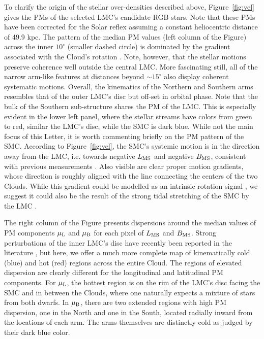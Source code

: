\documentclass[a4paper,useAMS,usenatbib]{mnras}
\begin{document}
To clarify the origin of the stellar over-densities described above,
Figure~\ref{fig:vel} gives the PMs of the selected LMC's candidate RGB
stars. Note that these PMs have been corrected for the Solar reflex
assuming a constant heliocentric distance of 49.9 kpc. The pattern of
the median PM values (left column of the Figure) across the inner
$10^{\circ}$ (smaller dashed circle) is dominated by the gradient
associated with the Cloud's rotation \citep[see
  also][]{Vasiliev2018}. Note, however, that the stellar motions
preserve coherence well outside the central LMC. More fascinating
still, all of the narrow arm-like features at distances beyond
$\sim15^{\circ}$ also display coherent systematic motions. Overall,
the kinematics of the Northern and Southern arms resembles that of the
outer LMC's disc but off-set in orbital phase. Note that the bulk of
the Southern sub-structure shares the PM of the LMC. This is
especially evident in the lower left panel, where the stellar streams
have colors from green to red, similar the LMC's disc, while the SMC
is dark blue. While not the main focus of this Letter, it is worth
commenting briefly on the PM pattern of the SMC. According to
Figure~\ref{fig:vel}, the SMC's systemic motion is in the direction
away from the LMC, i.e. towards negative $L_{\rm MS}$ and negative
$B_{\rm MS}$, consistent with previous measurements \citep[see
  e.g.][]{kallivayalil_lmc_pm}. Also visible are clear proper motion
gradients, whose direction is roughly aligned with the line connecting
the centers of the two Clouds. While this gradient could be modelled
as an intrinsic rotation signal \citep[see e.g.][]{Helmi2018}, we
suggest it could also be the result of the strong tidal stretching of
the SMC by the LMC \citep[see also][]{Zivick2018}.


The right column of the Figure presents dispersions around the median
values of PM components $\mu_{\rm L}$ and $\mu_{\rm B}$ for each pixel
of $L_{\rm MS}$ and $B_{\rm MS}$. Strong perturbations of the inner
LMC's disc have recently been reported in the literature
\citep[see][]{Choi2018}, but here, we offer a much more complete map
of kinematically cold (blue) and hot (red) regions across the entire
Cloud. The regions of elevated dispersion are clearly different for
the longitudinal and latitudinal PM components. For
$\mu_{\rm L}$, the hottest region is on the rim of the LMC's disc
facing the SMC and in between the Clouds, where one naturally expects
a mixture of stars from both dwarfs. In $\mu_{\rm B}$, there are two
extended regions with high PM dispersion, one in the North
and one in the South, located radially inward from the locations of
each arm. The arms themselves are distinctly cold as judged by their
dark blue color.
\end{document}
